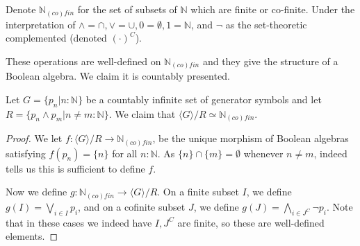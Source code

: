 \documentclass{../util/zariski-small}
\begin{document}
\begin{example}\label{ExampleBAunderNinfty}
  Denote $\mathbb N_{(co)fin}$ for the set of subsets of $\mathbb N$ which are finite or co-finite. 
  Under the interpretation of $\wedge = \cap , \vee = \cup, 0 = \emptyset, 1 = \mathbb N$, and $\neg$ 
  as the set-theoretic complemented (denoted $(\cdot)^C$). 

  These operations are well-defined on $\mathbb N_{(co)fin}$ 
  and they give the structure of a Boolean algebra.
  We claim it is countably presented. 

  Let $G = \{p_n| n:\mathbb N\} $ be a countably infinite set of generator symbols and let 
  $R = \{ p_n \wedge p_m | n\neq m :\mathbb N \}$. 
  We claim that $\langle G \rangle / R \simeq \mathbb N_{(co)fin}$. 

\begin{proof}
  We let $f:\langle G \rangle / R \to \mathbb N_{(co)fin}$, be the unique morphism of Boolean algebras 
  satisfying $f(p_n) = \{n\}$ for all $n:\mathbb N$. As $\{n\} \cap \{m\} = \emptyset$ whenever $n\neq m$, 
   indeed tells us this is sufficient to define $f$. 

  Now we define $g:\mathbb N_{(co)fin} \to \langle G \rangle / R$. 
  On a finite subset $I$, we define $g(I) = \bigvee_{i\in I} p_i$, 
  and on a cofinite subset $J$, we define $g(J) = \bigwedge _{i \in J^C} \neg p_i$. 
  Note that in these cases we indeed have $I,J^C$ are finite, so these are well-defined elements. 


\end{proof}
\end{example}
\end{document}
